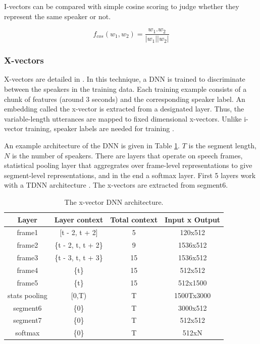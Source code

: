 		I-vectors can be compared with simple cosine scoring to judge whether they represent the same speaker or not.
		
		$$ f_{cos}(w_1, w_2) = \frac{w_1.w_2}{|w_1||w_2|} $$
		
		\subsubsection{X-vectors}
		X-vectors are detailed in \cite{snyder2018x}. In this technique, a DNN is trained to discriminate between the speakers in the training data. Each training example consists of a chunk of features (around 3 seconds) and the corresponding speaker label. An embedding called the x-vector is extracted from a designated layer. Thus, the variable-length utterances are mapped to fixed dimensional x-vectors. Unlike i-vector training, speaker labels are needed for training \cite{stafylakis2019self}.
		
		An example architecture of the DNN is given in Table \ref{table-xvec-dnn}. $T$ is the segment length, $N$ is the number of speakers. There are layers that operate on speech frames, statistical pooling layer that aggregrates over frame-level representations to give segment-level representations, and in the end a softmax layer. First 5 layers work with a TDNN architecture \cite{peddinti2015time}. The x-vectors are extracted from segment6.
		
		\begin{table}[h]
			\centering
			\begin{tabular}{|c|c|c|c|}
				\hline
				Layer & Layer context & Total context & Input x Output \\
				\hline
				frame1 & [t - 2, t + 2] & 5 & 120x512 \\
				frame2 & \{t - 2, t, t + 2\} & 9 & 1536x512 \\
				frame3 & \{t - 3, t, t + 3\} & 15 & 1536x512 \\
				frame4 & \{t\} & 15 & 512x512 \\
				frame5 & \{t\} & 15 & 512x1500 \\
				stats pooling & [0,T) & T & 1500Tx3000 \\
				segment6 & \{0\} & T & 3000x512 \\
				segment7 & \{0\} & T & 512x512 \\
				softmax & \{0\} & T & 512xN \\
				\hline
			\end{tabular}
			\caption{The x-vector DNN architecture.}
			\label{table-xvec-dnn}
		\end{table}
		
